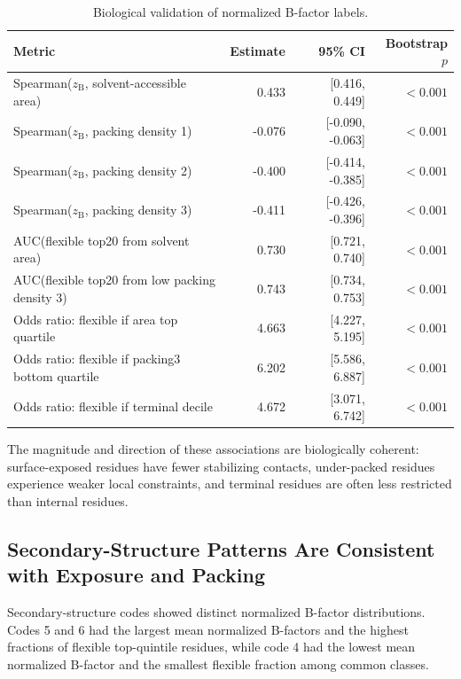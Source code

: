 \documentclass[11pt]{article}
\newcommand{\zB}{z_{\mathrm{B}}}
\begin{document}
\begin{table}[htbp]
\centering
\caption{Biological validation of normalized B-factor labels.}
\label{tab:biological_validation}
\begin{tabular}{lrrr}
\toprule
Metric & Estimate & 95\% CI & Bootstrap $p$ \\
\midrule
Spearman($\zB$, solvent-accessible area) & 0.433 & [0.416, 0.449] & $<0.001$ \\
Spearman($\zB$, packing density 1) & -0.076 & [-0.090, -0.063] & $<0.001$ \\
Spearman($\zB$, packing density 2) & -0.400 & [-0.414, -0.385] & $<0.001$ \\
Spearman($\zB$, packing density 3) & -0.411 & [-0.426, -0.396] & $<0.001$ \\
AUC(flexible top20 from solvent area) & 0.730 & [0.721, 0.740] & $<0.001$ \\
AUC(flexible top20 from low packing density 3) & 0.743 & [0.734, 0.753] & $<0.001$ \\
Odds ratio: flexible if area top quartile & 4.663 & [4.227, 5.195] & $<0.001$ \\
Odds ratio: flexible if packing3 bottom quartile & 6.202 & [5.586, 6.887] & $<0.001$ \\
Odds ratio: flexible if terminal decile & 4.672 & [3.071, 6.742] & $<0.001$ \\
\bottomrule
\end{tabular}
\end{table}

The magnitude and direction of these associations are biologically coherent: surface-exposed residues have fewer stabilizing contacts, under-packed residues experience weaker local constraints, and terminal residues are often less restricted than internal residues.

\subsection{Secondary-Structure Patterns Are Consistent with Exposure and Packing}
Secondary-structure codes showed distinct normalized B-factor distributions. Codes 5 and 6 had the largest mean normalized B-factors and the highest fractions of flexible top-quintile residues, while code 4 had the lowest mean normalized B-factor and the smallest flexible fraction among common classes.
\end{document}
